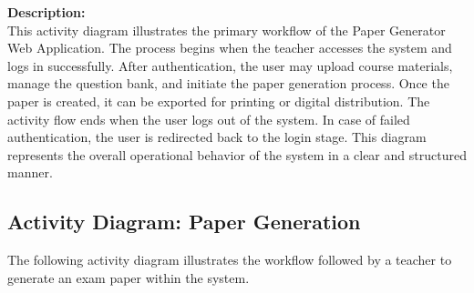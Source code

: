 \documentclass[12pt]{article}
\begin{document}
\begin{center}
{
	}
\end{center}
\newpage
\noindent\textbf{Description:} \\
This activity diagram illustrates the primary workflow of the Paper Generator Web Application. The process begins when the teacher accesses the system and logs in successfully. After authentication, the user may upload course materials, manage the question bank, and initiate the paper generation process. Once the paper is created, it can be exported for printing or digital distribution. The activity flow ends when the user logs out of the system. In case of failed authentication, the user is redirected back to the login stage. This diagram represents the overall operational behavior of the system in a clear and structured manner.

\newpage

\subsection{Activity Diagram: Paper Generation}

The following activity diagram illustrates the workflow followed by a teacher to generate an exam paper within the system.
\end{document}
